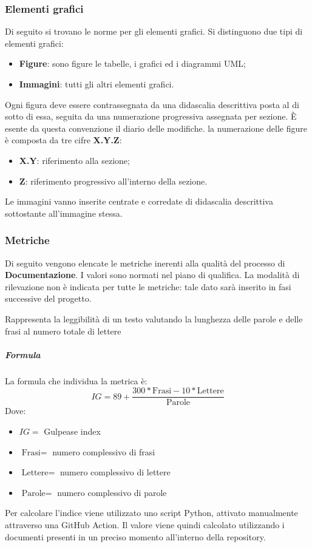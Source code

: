 	    \subsubsection{Elementi grafici}
	    Di seguito si trovano le norme per gli elementi grafici. Si distinguono due tipi di elementi grafici:
	    \begin{itemize}
	        \item \textbf{Figure}: sono figure le tabelle, i grafici ed i diagrammi UML;
	        \item \textbf{Immagini}: tutti gli altri elementi grafici. 
	    \end{itemize}
	    Ogni figura deve essere contrassegnata da una didascalia descrittiva posta al di sotto di essa, seguita da una numerazione progressiva assegnata per sezione. È esente da questa convenzione il diario delle modifiche.
	    la numerazione delle figure è composta da tre cifre \textbf{X.Y.Z}:
	    \begin{itemize}
	        \item \textbf{X.Y}: riferimento alla sezione;
	        \item \textbf{Z}: riferimento progressivo all'interno della sezione.
	    \end{itemize}
	    Le immagini vanno inserite centrate e corredate di didascalia descrittiva sottostante all'immagine stessa.
	    
	    \subsubsection{Metriche}
		Di seguito vengono elencate le metriche inerenti alla qualità del processo di \textbf{Documentazione}. I valori sono normati nel piano di qualifica. La modalità di rilevazione non è indicata per tutte le metriche: tale dato sarà inserito in fasi successive del progetto.
	    
        Rappresenta la leggibilità di un testo valutando la lunghezza delle parole e delle frasi al numero totale di lettere
        \subparagraph{Formula}
        La formula che individua la metrica è:
        \begin{displaymath}
        \textit{IG} = 89 + \frac{300 * \textrm{Frasi} - 10* \textrm{Lettere}}{\textrm{Parole}}
        \end{displaymath}
        Dove:
        \begin{itemize}
        \item[] $IG =$ Gulpease index
        \item[] $\textrm{Frasi} =$ numero complessivo di frasi
        \item[] $\textrm{Lettere} =$ numero complessivo di lettere
        \item[] $\textrm{Parole} =$ numero complessivo di parole
        \end{itemize}
        Per calcolare l'indice viene utilizzato uno script Python, attivato manualmente attraverso una GitHub Action. Il valore viene quindi calcolato utilizzando i documenti presenti in un preciso momento all'interno della repository.
        
